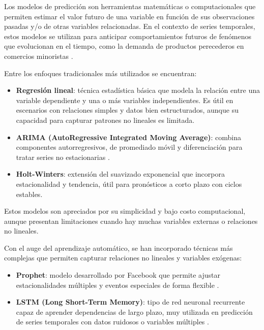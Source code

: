 Los modelos de predicción son herramientas matemáticas o computacionales que permiten estimar el valor futuro de una variable en función de sus observaciones pasadas y/o de otras variables relacionadas. En el contexto de series temporales, estos modelos se utilizan para anticipar comportamientos futuros de fenómenos que evolucionan en el tiempo, como la demanda de productos perecederos en comercios minoristas \parencite{hyndman2018}.

Entre los enfoques tradicionales más utilizados se encuentran:

\begin{itemize}
    \item \textbf{Regresión lineal}: técnica estadística básica que modela la relación entre una variable dependiente y una o más variables independientes. Es útil en escenarios con relaciones simples y datos bien estructurados, aunque su capacidad para capturar patrones no lineales es limitada.
    
    \item \textbf{ARIMA (AutoRegressive Integrated Moving Average)}: combina componentes autorregresivos, de promediado móvil y diferenciación para tratar series no estacionarias \parencite{box2015}.
    
    \item \textbf{Holt-Winters}: extensión del suavizado exponencial que incorpora estacionalidad y tendencia, útil para pronósticos a corto plazo con ciclos estables.
\end{itemize}

Estos modelos son apreciados por su simplicidad y bajo costo computacional, aunque presentan limitaciones cuando hay muchas variables externas o relaciones no lineales.

Con el auge del aprendizaje automático, se han incorporado técnicas más complejas que permiten capturar relaciones no lineales y variables exógenas:

\begin{itemize}
    \item \textbf{Prophet}: modelo desarrollado por Facebook que permite ajustar estacionalidades múltiples y eventos especiales de forma flexible \parencite{taylor2018}.
    
    \item \textbf{LSTM (Long Short-Term Memory)}: tipo de red neuronal recurrente capaz de aprender dependencias de largo plazo, muy utilizada en predicción de series temporales con datos ruidosos o variables múltiples \parencite{hewamalage2021}.
\end{itemize}

